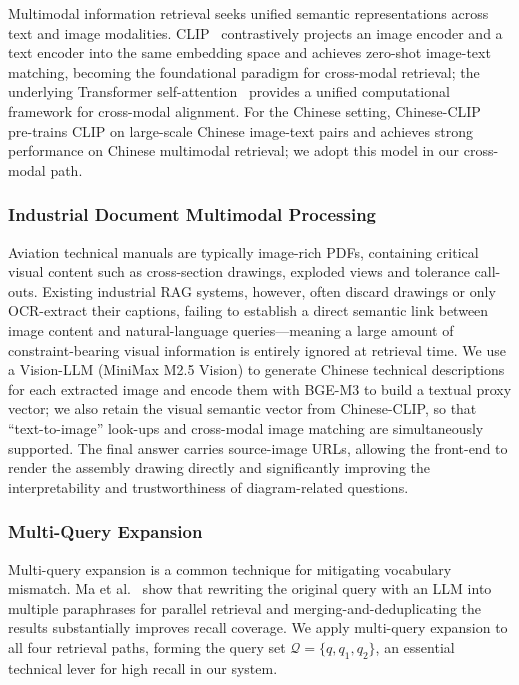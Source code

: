 \documentclass[applsci,article,submit,pdftex,moreauthors]{Definitions/mdpi}
\begin{document}
Multimodal information retrieval seeks unified semantic representations across text and image modalities. CLIP~\citep{radford2021clip} contrastively projects an image encoder and a text encoder into the same embedding space and achieves zero-shot image-text matching, becoming the foundational paradigm for cross-modal retrieval; the underlying Transformer self-attention~\citep{vaswani2017attention} provides a unified computational framework for cross-modal alignment. For the Chinese setting, Chinese-CLIP~\citep{yang2022chinese} pre-trains CLIP on large-scale Chinese image-text pairs and achieves strong performance on Chinese multimodal retrieval; we adopt this model in our cross-modal path.

\subsubsection{Industrial Document Multimodal Processing}

Aviation technical manuals are typically image-rich PDFs, containing critical visual content such as cross-section drawings, exploded views and tolerance call-outs. Existing industrial RAG systems, however, often discard drawings or only OCR-extract their captions, failing to establish a direct semantic link between image content and natural-language queries---meaning a large amount of constraint-bearing visual information is entirely ignored at retrieval time. We use a Vision-LLM (MiniMax M2.5 Vision) to generate Chinese technical descriptions for each extracted image and encode them with BGE-M3 to build a textual proxy vector; we also retain the visual semantic vector from Chinese-CLIP, so that ``text-to-image'' look-ups and cross-modal image matching are simultaneously supported. The final answer carries source-image URLs, allowing the front-end to render the assembly drawing directly and significantly improving the interpretability and trustworthiness of diagram-related questions.

\subsubsection{Multi-Query Expansion}

Multi-query expansion is a common technique for mitigating vocabulary mismatch. Ma et al.~\citep{ma2023query} show that rewriting the original query with an LLM into multiple paraphrases for parallel retrieval and merging-and-deduplicating the results substantially improves recall coverage. We apply multi-query expansion to all four retrieval paths, forming the query set $\mathcal{Q} = \{q, q_1, q_2\}$, an essential technical lever for high recall in our system.
\end{document}

